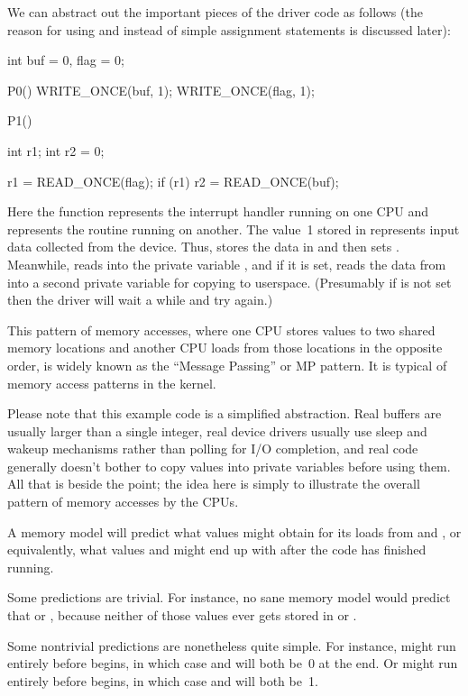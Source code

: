 We can abstract out the important pieces of the driver code as follows
(the reason for using  and  instead of
simple assignment statements is discussed later):

\begin{VerbatimU}
	int buf = 0, flag = 0;

	P0()
	{
		WRITE_ONCE(buf, 1);
		WRITE_ONCE(flag, 1);
	}

	P1()
	{
		int r1;
		int r2 = 0;

		r1 = READ_ONCE(flag);
		if (r1)
			r2 = READ_ONCE(buf);
	}
\end{VerbatimU}

Here the  function represents the interrupt handler running on one
CPU and  represents the  routine running on another.
The value~1 stored in  represents input data collected from the device.
Thus,  stores the data in  and then sets .
Meanwhile,  reads  into the private variable ,
and if it is set, reads the data from  into a second private
variable  for copying to userspace.
(Presumably if  is not set then the driver will wait a while
and try again.)

This pattern of memory accesses, where one CPU stores values to two
shared memory locations and another CPU loads from those locations in
the opposite order, is widely known as the ``Message Passing'' or MP
pattern.
It is typical of memory access patterns in the kernel.

Please note that this example code is a simplified abstraction.
Real buffers are usually larger than a single integer, real device drivers
usually use sleep and wakeup mechanisms rather than polling for I/O
completion, and real code generally doesn't bother to copy values into
private variables before using them.
All that is beside the point; the idea here is simply to illustrate the
overall pattern of memory accesses by the CPUs.

A memory model will predict what values  might obtain for its loads
from  and , or equivalently, what values  and
 might end up with after the code has finished running.

Some predictions are trivial.
For instance, no sane memory model would predict that  or
, because neither of those values ever gets stored in
 or .

Some nontrivial predictions are nonetheless quite simple.
For instance,  might run entirely before  begins, in which
case  and  will both be~0 at the end.
Or  might run entirely before  begins, in which case
 and  will both be~1.

